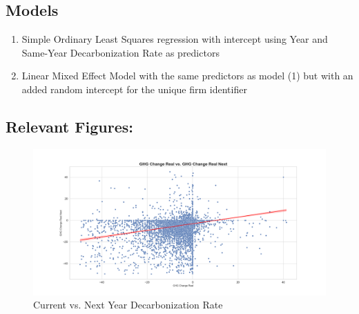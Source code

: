 \subsection{Models} 
\begin{enumerate}
    \item Simple Ordinary Least Squares regression with intercept using Year and Same-Year Decarbonization Rate as predictors
    \item Linear Mixed Effect Model with the same predictors as model (1) but with an added random intercept for the unique firm identifier
\end{enumerate}




\subsection{Relevant Figures:}

\begin{figure}[H]
\centering
  \includegraphics[width=\textwidth]{figures/ghg_change_real_vs_ghg_change_real_next.png}
\caption{Current vs. Next Year Decarbonization Rate}
\label{fig:ghg_change_real_vs_ghg_change_real_next}
\end{figure}

